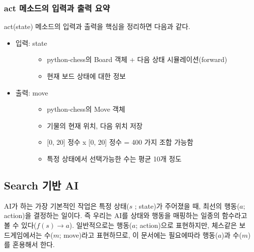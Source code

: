 \documentclass[letterpaper,10pt,english]{sphinxmanual}
\begin{document}
\subsubsection{act 메소드의 입력과 출력 요약}
\label{\detokenize{03-basic_ai_examples:act}}
act(state) 메소드의 입력과 출력을 핵심을 정리하면 다음과 같다.
\begin{itemize}
\item {} \begin{description}
\item[{입력: state}] \leavevmode\begin{itemize}
\item {} 
python-chess의 Board 객체 + 다음 상태 시뮬레이션(forward)

\item {} 
현재 보드 상태에 대한 정보

\end{itemize}

\end{description}

\item {} \begin{description}
\item[{출력: move}] \leavevmode\begin{itemize}
\item {} 
python-chess의 Move 객체

\item {} 
기물의 현재 위치, 다음 위치 저장

\item {} 
{[}0, 20{]} 정수 x {[}0, 20{]} 정수 = 400 가지 조합 가능함

\item {} 
특정 상태에서 선택가능한 수는 평균 10개 정도

\end{itemize}

\end{description}

\end{itemize}


\subsection{Search 기반 AI}
\label{\detokenize{03-basic_ai_examples:search-ai}}
AI가 하는 가장 기본적인 작업은 특정 상태(\(s\) ; state)가 주어졌을 때, 최선의 행동(\(a\); action)을 결정하는 일이다.
즉 우리는 AI를 상태와 행동을 매핑하는 일종의 함수라고 볼 수 있다(\(f(s) \rightarrow a\)).
일반적으로는 행동(\(a\); action)으로 표현하지만, 체스같은 보드게임에서는 수(\(m\); move)라고 표현하므로, 이 문서에는 필요에따라
행동(\(a\))과 수(\(m\))를 혼용해서 한다.
\end{document}
